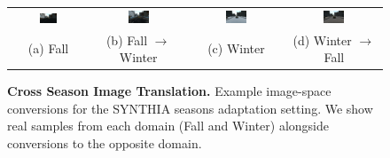 \begin{figure}
  \centering
  \setlength{\tabcolsep}{2.0pt}
  \begin{tabular}{cccc}
    \includegraphics[width=0.24\textwidth]{figs/synthia/fall-seq1-fs8.png} &
    \includegraphics[width=0.24\textwidth]{figs/synthia/fake-winter-seq1-fs8.png} &
    \includegraphics[width=0.24\textwidth]{figs/synthia/winter-seq1-fs8.png} &
    \includegraphics[width=0.24\textwidth]{figs/synthia/fake-fall-seq1-fs8.png}
    \\
	   (a) Fall & (b) Fall $\rightarrow$ Winter & (c) Winter & (d) Winter $\rightarrow$ Fall
  \end{tabular}
  \caption{
    \textbf{Cross Season Image Translation.} Example image-space conversions for the SYNTHIA seasons adaptation setting.
    We show real samples from each domain (Fall and Winter) alongside conversions to the opposite domain.
    }
  \label{fig:synthia}
\end{figure}

